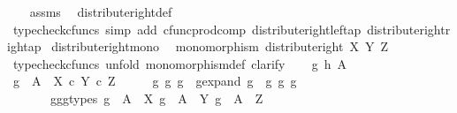 \begin{isabellebody}
%
\isadelimproof
\ \ %
\endisadelimproof
%
\isatagproof
{}\isamarkupfalse%
\ assms\ \isamarkupfalse%
\ distribute{\isacharunderscore}{\kern0pt}right{\isacharunderscore}{\kern0pt}def\ \ \isanewline
\ \ \isamarkupfalse%
\ {\isacharparenleft}{\kern0pt}typecheck{\isacharunderscore}{\kern0pt}cfuncs{\isacharcomma}{\kern0pt}\ simp\ add{\isacharcolon}{\kern0pt}\ cfunc{\isacharunderscore}{\kern0pt}prod{\isacharunderscore}{\kern0pt}comp\ distribute{\isacharunderscore}{\kern0pt}right{\isacharunderscore}{\kern0pt}left{\isacharunderscore}{\kern0pt}ap\ distribute{\isacharunderscore}{\kern0pt}right{\isacharunderscore}{\kern0pt}right{\isacharunderscore}{\kern0pt}ap{\isacharparenright}{\kern0pt}%
\endisatagproof
{\isafoldproof}%
%
\isadelimproof
\isanewline
%
\endisadelimproof
\isanewline
{}\isamarkupfalse%
\ distribute{\isacharunderscore}{\kern0pt}right{\isacharunderscore}{\kern0pt}mono{\isacharcolon}{\kern0pt}\isanewline
\ \ {\isachardoublequoteopen}monomorphism\ {\isacharparenleft}{\kern0pt}distribute{\isacharunderscore}{\kern0pt}right\ X\ Y\ Z{\isacharparenright}{\kern0pt}{\isachardoublequoteclose}\isanewline
%
\isadelimproof
%
\endisadelimproof
%
\isatagproof
{}\isamarkupfalse%
\ {\isacharparenleft}{\kern0pt}typecheck{\isacharunderscore}{\kern0pt}cfuncs{\isacharcomma}{\kern0pt}\ unfold\ monomorphism{\isacharunderscore}{\kern0pt}def{}{\isacharcomma}{\kern0pt}\ clarify{\isacharparenright}{\kern0pt}\isanewline
\ \ \isamarkupfalse%
\ g\ h\ A\isanewline
\ \ \isamarkupfalse%
\ {\isachardoublequoteopen}g\ {\isacharcolon}{\kern0pt}\ A\ {\isasymrightarrow}\ {\isacharparenleft}{\kern0pt}X\ {\isasymtimes}\isactrlsub c\ Y{\isacharparenright}{\kern0pt}\ {\isasymtimes}\isactrlsub c\ Z{\isachardoublequoteclose}\isanewline
\ \ \isamarkupfalse%
\ \isamarkupfalse%
\ g{}\ g{}\ g{}\ \ g{\isacharunderscore}{\kern0pt}expand{\isacharcolon}{\kern0pt}\ {\isachardoublequoteopen}g\ {\isacharequal}{\kern0pt}\ {\isasymlangle}{\isasymlangle}g{}{\isacharcomma}{\kern0pt}\ g{}{\isasymrangle}{\isacharcomma}{\kern0pt}\ g{}{\isasymrangle}{\isachardoublequoteclose}\isanewline
\ \ \ \ \ \ \ g{}{\isacharunderscore}{\kern0pt}g{}{\isacharunderscore}{\kern0pt}g{}{\isacharunderscore}{\kern0pt}types{\isacharcolon}{\kern0pt}\ {\isachardoublequoteopen}g{}\ {\isacharcolon}{\kern0pt}\ A\ {\isasymrightarrow}\ X{\isachardoublequoteclose}\ {\isachardoublequoteopen}g{}\ {\isacharcolon}{\kern0pt}\ A\ {\isasymrightarrow}\ Y{\isachardoublequoteclose}\ {\isachardoublequoteopen}g{}\ {\isacharcolon}{\kern0pt}\ A\ {\isasymrightarrow}\ Z{\isachardoublequoteclose}\isanewline

\end{isabellebody}
